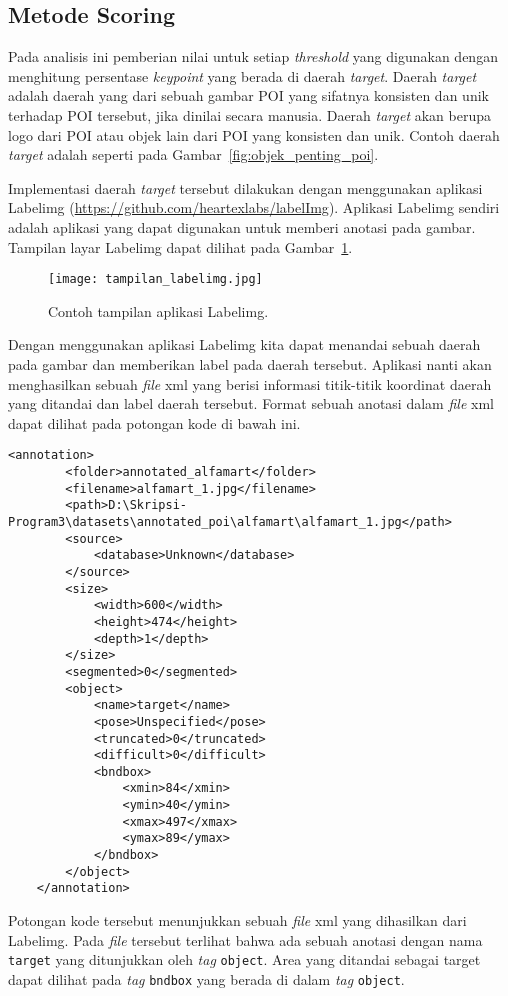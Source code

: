 \subsection{Metode Scoring}
\label{subsec:scoring_analisis_threshold}
Pada analisis ini pemberian nilai untuk setiap \textit{threshold} yang digunakan dengan menghitung persentase \textit{keypoint} yang berada di daerah \textit{target}. Daerah \textit{target} adalah daerah yang dari sebuah gambar POI yang sifatnya konsisten dan unik terhadap POI tersebut, jika dinilai secara manusia. Daerah \textit{target} akan berupa logo dari POI atau objek lain dari POI yang konsisten dan unik. Contoh daerah \textit{target} adalah seperti pada Gambar~\ref{fig:objek_penting_poi}.

Implementasi daerah \textit{target} tersebut dilakukan dengan menggunakan aplikasi Labelimg (\url{https://github.com/heartexlabs/labelImg}). Aplikasi Labelimg sendiri adalah aplikasi yang dapat digunakan untuk memberi anotasi pada gambar. Tampilan layar Labelimg dapat dilihat pada Gambar~\ref{fig:tampilan_labelimg}.

\begin{figure}[H]
	\centering
	\texttt{[image: tampilan\_labelimg.jpg]}
	\caption{Contoh tampilan aplikasi Labelimg.}
	\label{fig:tampilan_labelimg}
\end{figure}

Dengan menggunakan aplikasi Labelimg kita dapat menandai sebuah daerah pada gambar dan memberikan label pada daerah tersebut. Aplikasi nanti akan menghasilkan sebuah \textit{file} xml yang berisi informasi titik-titik koordinat daerah yang ditandai dan label daerah tersebut. Format sebuah anotasi dalam \textit{file} xml dapat dilihat pada potongan kode di bawah ini.
\begin{lstlisting}[basicstyle=\small]
	<annotation>
		<folder>annotated_alfamart</folder>
		<filename>alfamart_1.jpg</filename>
		<path>D:\Skripsi-Program3\datasets\annotated_poi\alfamart\alfamart_1.jpg</path>
		<source>
			<database>Unknown</database>
		</source>
		<size>
			<width>600</width>
			<height>474</height>
			<depth>1</depth>
		</size>
		<segmented>0</segmented>
		<object>
			<name>target</name>
			<pose>Unspecified</pose>
			<truncated>0</truncated>
			<difficult>0</difficult>
			<bndbox>
				<xmin>84</xmin>
				<ymin>40</ymin>
				<xmax>497</xmax>
				<ymax>89</ymax>
			</bndbox>
		</object>
	</annotation>
\end{lstlisting}
Potongan kode tersebut menunjukkan sebuah \textit{file} xml yang dihasilkan dari Labelimg. Pada \textit{file} tersebut terlihat bahwa ada sebuah anotasi dengan nama \texttt{target} yang ditunjukkan oleh \textit{tag} \texttt{object}. Area yang ditandai sebagai target dapat dilihat pada \textit{tag} \texttt{bndbox} yang berada di dalam \textit{tag} \texttt{object}.

